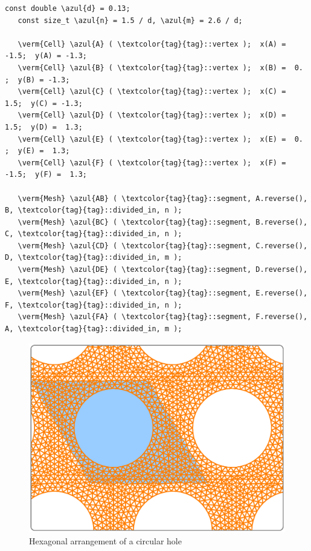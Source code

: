 \begin{Verbatim}[commandchars=\\\{\},formatcom=\small\tt,frame=single,
   label=parag-\ref{\numb section 7.\numb parag 15}.cpp,rulecolor=\color{coment},
   baselinestretch=0.94,framesep=2mm                                             ]
   const double \azul{d} = 0.13;
   const size_t \azul{n} = 1.5 / d, \azul{m} = 2.6 / d;

   \verm{Cell} \azul{A} ( \textcolor{tag}{tag}::vertex );  x(A) = -1.5;  y(A) = -1.3;
   \verm{Cell} \azul{B} ( \textcolor{tag}{tag}::vertex );  x(B) =  0. ;  y(B) = -1.3;
   \verm{Cell} \azul{C} ( \textcolor{tag}{tag}::vertex );  x(C) =  1.5;  y(C) = -1.3;
   \verm{Cell} \azul{D} ( \textcolor{tag}{tag}::vertex );  x(D) =  1.5;  y(D) =  1.3;
   \verm{Cell} \azul{E} ( \textcolor{tag}{tag}::vertex );  x(E) =  0. ;  y(E) =  1.3;
   \verm{Cell} \azul{F} ( \textcolor{tag}{tag}::vertex );  x(F) = -1.5;  y(F) =  1.3;

   \verm{Mesh} \azul{AB} ( \textcolor{tag}{tag}::segment, A.reverse(), B, \textcolor{tag}{tag}::divided_in, n );
   \verm{Mesh} \azul{BC} ( \textcolor{tag}{tag}::segment, B.reverse(), C, \textcolor{tag}{tag}::divided_in, n );
   \verm{Mesh} \azul{CD} ( \textcolor{tag}{tag}::segment, C.reverse(), D, \textcolor{tag}{tag}::divided_in, m );
   \verm{Mesh} \azul{DE} ( \textcolor{tag}{tag}::segment, D.reverse(), E, \textcolor{tag}{tag}::divided_in, n );
   \verm{Mesh} \azul{EF} ( \textcolor{tag}{tag}::segment, E.reverse(), F, \textcolor{tag}{tag}::divided_in, n );
   \verm{Mesh} \azul{FA} ( \textcolor{tag}{tag}::segment, F.reverse(), A, \textcolor{tag}{tag}::divided_in, m );
\end{Verbatim}

\begin{figure}[ht] \centering
  \includegraphics[width=140mm]{hexa-round-hole.eps}
  \caption{Hexagonal arrangement of a circular hole}
  \label{\numb section 7.\numb fig 11}
\end{figure}

